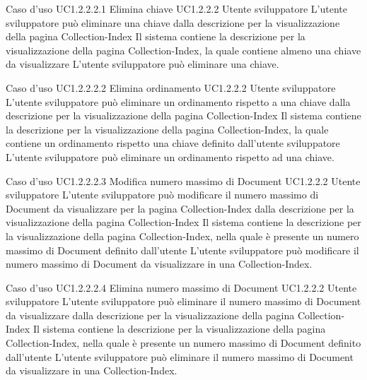 \UCtitle
{Caso d'uso UC1.2.2.2.1}
{Elimina chiave}
\UC
{UC1.2.2.2}
{Utente sviluppatore}
{L'utente sviluppatore  può eliminare una chiave dalla descrizione per la visualizzazione della pagina Collection-Index}
{Il sistema contiene la descrizione per la visualizzazione della pagina Collection-Index, la quale contiene almeno una chiave da visualizzare}
\scenario
{L'utente sviluppatore può eliminare una chiave.}


\UCtitle
{Caso d'uso UC1.2.2.2.2}
{Elimina ordinamento}
\UC
{UC1.2.2.2}
{Utente sviluppatore}
{L'utente sviluppatore  può eliminare un ordinamento rispetto a una chiave dalla descrizione per la visualizzazione della pagina Collection-Index}
{Il sistema contiene la descrizione per la visualizzazione della pagina Collection-Index, la quale contiene un ordinamento rispetto una chiave definito dall'utente sviluppatore}
\scenario
{L'utente sviluppatore può eliminare un ordinamento rispetto ad una chiave.}

\UCtitle
{Caso d'uso UC1.2.2.2.3}
{Modifica numero massimo di Document}
\UC
{UC1.2.2.2}
{Utente sviluppatore}
{L'utente sviluppatore  può modificare il numero massimo di Document da visualizzare per la pagina Collection-Index dalla descrizione per la visualizzazione della pagina Collection-Index}
{Il sistema contiene la descrizione per la visualizzazione della pagina Collection-Index, nella quale è presente un numero massimo di Document definito dall'utente}
\scenario
{L'utente sviluppatore può modificare il numero massimo di Document da visualizzare in una Collection-Index.}

\UCtitle
{Caso d'uso UC1.2.2.2.4}
{Elimina numero massimo di Document}
\UC
{UC1.2.2.2}
{Utente sviluppatore}
{L'utente sviluppatore  può eliminare il numero massimo di Document da visualizzare dalla descrizione per la visualizzazione della pagina Collection-Index}
{Il sistema contiene la descrizione per la visualizzazione della pagina Collection-Index, nella quale è presente un numero massimo di Document definito dall'utente}
\scenario
{L'utente sviluppatore può eliminare il numero massimo di Document da visualizzare in una Collection-Index.}

